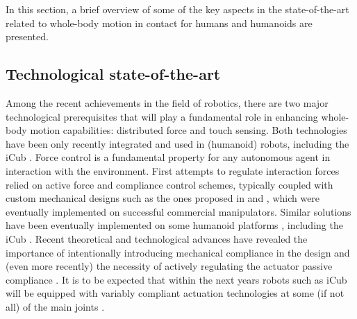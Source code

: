 \documentclass[final,5p,twocolumn]{elsarticle}
\begin{document}
In this section, a brief overview of some of the key aspects in the state-of-the-art related to whole-body motion in contact for humans and humanoids are presented.

\subsection{Technological state-of-the-art}
Among the recent achievements in the field of robotics, there are two major technological prerequisites that will play a fundamental role in enhancing whole-body motion capabilities: distributed force and touch sensing. Both technologies have been only recently integrated and used in (humanoid) robots, including the iCub \cite{MettaG._etal2010}.
Force control is a fundamental property for any autonomous agent in interaction with the environment. First attempts to regulate interaction forces relied on active force and compliance control schemes, typically coupled with custom mechanical designs such as the ones proposed in \cite{Salisbury1988} and \cite{Hayashi2007}, which were eventually implemented on successful commercial manipulators. Similar solutions have been eventually implemented on some humanoid platforms \cite{Cheng2006} \cite{Escande2010}, including the iCub \cite{Fumagalli2012}. Recent theoretical and technological advances have revealed the importance of intentionally introducing mechanical compliance in the design \cite{Pratt1995} and (even more recently) the necessity of actively regulating the actuator passive compliance \cite{Koganezawa2005} \cite{Tonietti2005} \cite{Migliore2005}. It is to be expected that within the next years robots such as iCub will be equipped with variably compliant actuation technologies at some (if not all) of the main joints \cite{Tsagarakis2009} \cite{Tsagarakis2011}.
\end{document}

